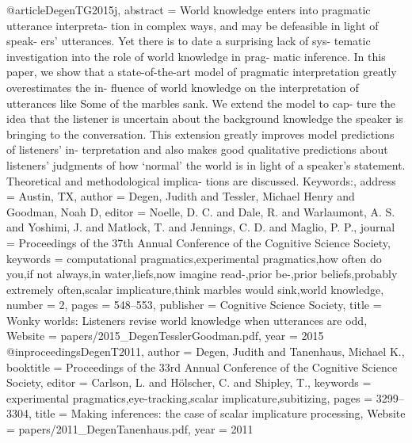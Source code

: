 @article{DegenTG2015j,
abstract = {World knowledge enters into pragmatic utterance interpreta- tion in complex ways, and may be defeasible in light of speak- ers' utterances. Yet there is to date a surprising lack of sys- tematic investigation into the role of world knowledge in prag- matic inference. In this paper, we show that a state-of-the-art model of pragmatic interpretation greatly overestimates the in- fluence of world knowledge on the interpretation of utterances like Some of the marbles sank. We extend the model to cap- ture the idea that the listener is uncertain about the background knowledge the speaker is bringing to the conversation. This extension greatly improves model predictions of listeners' in- terpretation and also makes good qualitative predictions about listeners' judgments of how ‘normal' the world is in light of a speaker's statement. Theoretical and methodological implica- tions are discussed. Keywords:},
address = {Austin, TX},
author = {Degen, Judith and Tessler, Michael Henry and Goodman, Noah D},
editor = {Noelle, D. C. and Dale, R. and Warlaumont, A. S. and Yoshimi, J. and Matlock, T. and Jennings, C. D. and Maglio, P. P.},
journal = {Proceedings of the 37th Annual Conference of the Cognitive Science Society},
keywords = {computational pragmatics,experimental pragmatics,how often do you,if not always,in water,liefs,now imagine read-,prior be-,prior beliefs,probably extremely often,scalar implicature,think marbles would sink,world knowledge},
number = {2},
pages = {548--553},
publisher = {Cognitive Science Society},
title = {{Wonky worlds: Listeners revise world knowledge when utterances are odd}},
Website = {papers/2015_DegenTesslerGoodman.pdf},
year = {2015}
}
@inproceedings{DegenT2011,
author = {Degen, Judith and Tanenhaus, Michael K.},
booktitle = {Proceedings of the 33rd Annual Conference of the Cognitive Science Society},
editor = {Carlson, L. and H{\"{o}}lscher, C. and Shipley, T.},
keywords = {experimental pragmatics,eye-tracking,scalar implicature,subitizing},
pages = {3299--3304},
title = {{Making inferences: the case of scalar implicature processing}},
Website = {papers/2011_DegenTanenhaus.pdf},
year = {2011}
}
